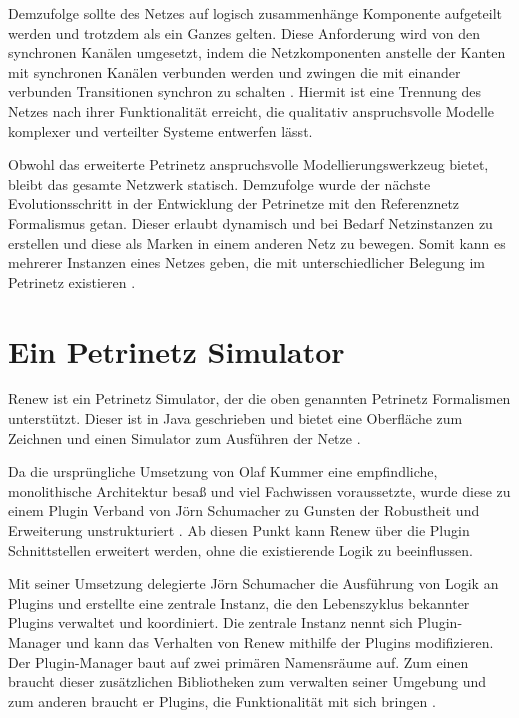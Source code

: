 	Demzufolge sollte des Netzes auf logisch zusammenhänge Komponente aufgeteilt werden und trotzdem als ein Ganzes gelten. Diese Anforderung wird von den synchronen Kanälen umgesetzt, indem die Netzkomponenten anstelle der Kanten mit synchronen Kanälen verbunden werden und zwingen die mit einander verbunden Transitionen synchron zu schalten \cite{kummerReferenznetze}. Hiermit ist eine Trennung des Netzes nach ihrer Funktionalität erreicht, die qualitativ anspruchsvolle Modelle komplexer und verteilter Systeme entwerfen lässt.\bigbreak

	Obwohl das erweiterte Petrinetz anspruchsvolle Modellierungswerkzeug bietet, bleibt das gesamte Netzwerk statisch. Demzufolge wurde der nächste Evolutionsschritt in der Entwicklung der Petrinetze mit den Referenznetz Formalismus getan. Dieser erlaubt dynamisch und bei Bedarf Netzinstanzen zu erstellen und diese als Marken in einem anderen Netz zu bewegen. Somit kann es mehrerer Instanzen eines Netzes geben, die mit unterschiedlicher Belegung im Petrinetz existieren \cite{kummerReferenznetze}.

\section{Ein Petrinetz Simulator} \label{sec:EPS}

	Renew ist ein Petrinetz Simulator, der die oben genannten Petrinetz Formalismen unterstützt. Dieser ist in Java geschrieben und bietet eine Oberfläche zum Zeichnen und einen Simulator zum Ausführen der Netze \cite{userGuide}.\bigbreak

	Da die ursprüngliche Umsetzung von Olaf Kummer eine empfindliche, monolithische Architektur besaß und viel Fachwissen voraussetzte, wurde diese zu einem Plugin Verband von Jörn Schumacher zu Gunsten der Robustheit und Erweiterung unstrukturiert \cite{schummacher}. Ab diesen Punkt kann Renew über die Plugin Schnittstellen erweitert werden, ohne die existierende Logik zu beeinflussen.\bigbreak

	Mit seiner Umsetzung delegierte Jörn Schumacher die Ausführung von Logik an Plugins und erstellte eine zentrale Instanz, die den Lebenszyklus bekannter Plugins verwaltet und koordiniert. Die zentrale Instanz nennt sich Plugin-Manager und kann das Verhalten von Renew mithilfe der Plugins modifizieren. Der Plugin-Manager baut auf zwei primären Namensräume auf. Zum einen braucht dieser zusätzlichen Bibliotheken zum verwalten seiner Umgebung und zum anderen braucht er Plugins, die Funktionalität mit sich bringen \cite{douvigneau}.

